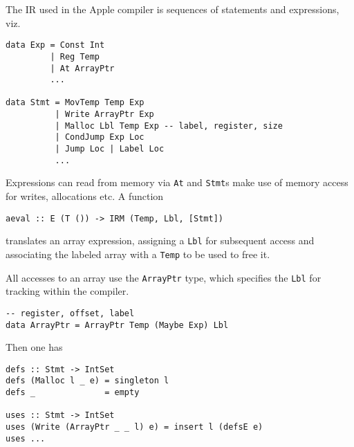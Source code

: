 \documentclass[sigplan,screen]{acmart}
\begin{document}


The IR used in the Apple compiler is sequences of statements and expressions, viz.

\begin{verbatim}
data Exp = Const Int
         | Reg Temp
         | At ArrayPtr
         ...

data Stmt = MovTemp Temp Exp
          | Write ArrayPtr Exp
          | Malloc Lbl Temp Exp -- label, register, size
          | CondJump Exp Loc
          | Jump Loc | Label Loc
          ...
\end{verbatim}

Expressions can read from memory via {\tt At} and {\tt Stmt}s make use of memory access for writes, allocations etc. A function

\begin{verbatim}
aeval :: E (T ()) -> IRM (Temp, Lbl, [Stmt])
\end{verbatim}
translates an array expression, assigning a {\tt Lbl} for subsequent access and associating the labeled array with a {\tt Temp} to be used to free it.

All accesses to an array use the {\tt ArrayPtr} type, which specifies the {\tt Lbl} for tracking within the compiler.

\begin{verbatim}
-- register, offset, label
data ArrayPtr = ArrayPtr Temp (Maybe Exp) Lbl
\end{verbatim}

Then one has

\begin{verbatim}
defs :: Stmt -> IntSet
defs (Malloc l _ e) = singleton l
defs _              = empty

uses :: Stmt -> IntSet
uses (Write (ArrayPtr _ _ l) e) = insert l (defsE e)
uses ...
\end{verbatim}
\end{document}
